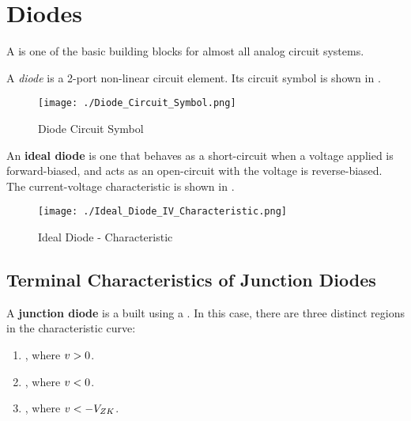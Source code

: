 \section{Diodes}\label{sec:Diodes}
A  is one of the basic building blocks for almost all analog circuit systems.

\begin{definition}[Diode]\label{def:Diode}
  A \emph{diode} is a 2-port non-linear circuit element.
  Its circuit symbol is shown in .
\end{definition}

\begin{figure}[h!tbp]
  \centering
  \texttt{[image: ./Diode\_Circuit\_Symbol.png]}
  \caption{Diode Circuit Symbol \parencite[p.~177]{sedraTextbook7}}
  \label{fig:Diode_Circuit_Symbol}
\end{figure}

An \textbf{ideal diode} is one that behaves as a short-circuit when a voltage applied is forward-biased, and acts as an open-circuit with the voltage is reverse-biased.
The current-voltage characteristic is shown in .

\begin{figure}[h!tbp]
  \centering
  \texttt{[image: ./Ideal\_Diode\_IV\_Characteristic.png]}
  \caption{Ideal Diode \DCCurrent{}-\DCVoltage{} Characteristic \parencite[p.~177]{sedraTextbook7}}
  \label{fig:Ideal_Diode_IV_Characteristic}
\end{figure}

\subsection{Terminal Characteristics of Junction Diodes}\label{subsec:Terminal_Characteristics_Junction_Diodes}
A \textbf{junction diode} is a  built using a \PNJunction{}.
In this case, there are three distinct regions in the characteristic curve:
\begin{enumerate}[noitemsep]
\item {}, where $v > 0$.
\item {}, where $v < 0$.
\item {}, where $v < - V_{ZK}$.
\end{enumerate}

